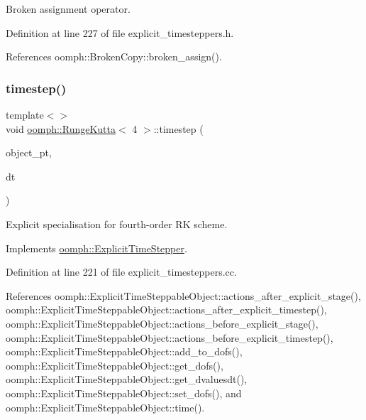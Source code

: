 Broken assignment operator. 



Definition at line 227 of file explicit\+\_\+timesteppers.\+h.



References oomph\+::\+Broken\+Copy\+::broken\+\_\+assign().

\mbox{\label{classoomph_1_1RungeKutta_a506750a0c4fe555f434dadf139ad4f07}} 
\subsubsection{\texorpdfstring{timestep()}{timestep()}\hspace{0.1cm}{\footnotesize\ttfamily [1/3]}}
{\footnotesize\ttfamily template$<$$>$ \\
void \hyperlink{classoomph_1_1RungeKutta}{oomph\+::\+Runge\+Kutta}$<$ 4 $>$\+::timestep (\begin{DoxyParamCaption}\item[{\hyperlink{classoomph_1_1ExplicitTimeSteppableObject}{Explicit\+Time\+Steppable\+Object} $\ast$const \&}]{object\+\_\+pt,  }\item[{const double \&}]{dt }\end{DoxyParamCaption})\hspace{0.3cm}{\ttfamily [virtual]}}



Explicit specialisation for fourth-\/order RK scheme. 



Implements \hyperlink{classoomph_1_1ExplicitTimeStepper_ab43bbab17960d0f50b8842e996f5c765}{oomph\+::\+Explicit\+Time\+Stepper}.



Definition at line 221 of file explicit\+\_\+timesteppers.\+cc.



References oomph\+::\+Explicit\+Time\+Steppable\+Object\+::actions\+\_\+after\+\_\+explicit\+\_\+stage(), oomph\+::\+Explicit\+Time\+Steppable\+Object\+::actions\+\_\+after\+\_\+explicit\+\_\+timestep(), oomph\+::\+Explicit\+Time\+Steppable\+Object\+::actions\+\_\+before\+\_\+explicit\+\_\+stage(), oomph\+::\+Explicit\+Time\+Steppable\+Object\+::actions\+\_\+before\+\_\+explicit\+\_\+timestep(), oomph\+::\+Explicit\+Time\+Steppable\+Object\+::add\+\_\+to\+\_\+dofs(), oomph\+::\+Explicit\+Time\+Steppable\+Object\+::get\+\_\+dofs(), oomph\+::\+Explicit\+Time\+Steppable\+Object\+::get\+\_\+dvaluesdt(), oomph\+::\+Explicit\+Time\+Steppable\+Object\+::set\+\_\+dofs(), and oomph\+::\+Explicit\+Time\+Steppable\+Object\+::time().


